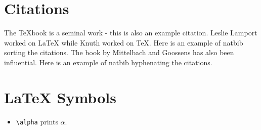 \documentclass{article}
\begin{document}
\cleardoublepage

\section{Citations}
The TeXbook\cite{Knuth84} is a seminal work - this is also an example citation.  Leslie Lamport worked on LaTeX
while Knuth worked on TeX.  Here is an example of natbib sorting the citations\cite{Lamp86,Knuth84}.
The book by Mittelbach and Goossens\cite{Mitt04} has also been influential.
Here is an example of natbib hyphenating the citations\cite{Knuth84,Lamp86,Mitt04}.

\cleardoublepage




\appendix
\section{LaTeX Symbols}
\begin{itemize}
    \item \texttt{\textbackslash alpha} prints $\alpha$.
\end{itemize}
\end{document}
